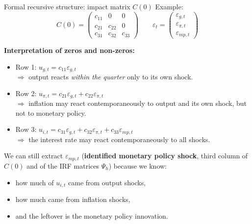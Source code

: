 \documentclass{beamer}
\begin{document}
\begin{frame}{Formal recursive structure: impact matrix $C(0)$}
\footnotesize
Example:
\[
C(0) =
\begin{pmatrix}
c_{11} & 0      & 0 \\
c_{21} & c_{22} & 0 \\
c_{31} & c_{32} & c_{33}
\end{pmatrix}
\qquad
\varepsilon_t =
\begin{pmatrix}
\varepsilon_{g,t} \\[2pt]
\varepsilon_{\pi,t} \\[2pt]
\varepsilon_{mp,t}
\end{pmatrix}
\]

\medskip
\textbf{Interpretation of zeros and non-zeros:}
\begin{itemize}
  \item Row 1: $u_{g,t} = c_{11}\varepsilon_{g,t}$ \\
        $\Rightarrow$ output reacts \emph{within the quarter} only to its own shock.
  \item Row 2: $u_{\pi,t} = c_{21}\varepsilon_{g,t} + c_{22}\varepsilon_{\pi,t}$ \\
        $\Rightarrow$ inflation may react contemporaneously to output and its own shock,
        but not to monetary policy.
  \item Row 3: $u_{i,t} = c_{31}\varepsilon_{g,t} + c_{32}\varepsilon_{\pi,t} + c_{33}\varepsilon_{mp,t}$ \\
        $\Rightarrow$ the interest rate may react contemporaneously to all shocks.
\end{itemize}

\medskip
We can still extract $\varepsilon_{mp,t}$ (\textbf{identified monetary policy shock}, third column of $C(0)$ and of the IRF matrices $\Psi_h$) because we know:
\begin{itemize}
    \item how much of $u_{i,t}$ came from output shocks,
    \item how much came from inflation shocks,
    \item and the leftover is the monetary policy innovation.
\end{itemize}
\end{frame}
\end{document}
